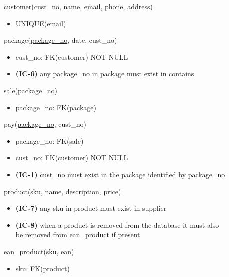 \documentclass[12pt,a4paper]{article}
\begin{document}
\ttfamily

\vspace*{10pt}
\noindent
customer(\underline{cust\_no}, name, email, phone, address)
\begin{itemize}[nosep]
    \item UNIQUE(email)
\end{itemize}

\vspace*{10pt}
\noindent
package(\underline{package\_no}, date, cust\_no)
\begin{itemize}[nosep]
    \item cust\_no: FK(customer) NOT NULL
    \item \textsf{\textbf{(IC-6)}} any package\_no in package \textsf{must exist} in contains
\end{itemize}

\vspace*{10pt}
\noindent
sale(\underline{package\_no})
\begin{itemize}[nosep]
    \item package\_no: FK(package)
\end{itemize}

\vspace*{10pt}
\noindent
pay(\underline{package\_no}, cust\_no)
\begin{itemize}[nosep]
    \item package\_no: FK(sale)
    \item cust\_no: FK(customer) NOT NULL
    \item \textsf{\textbf{(IC-1)}} cust\_no \textsf{must exist} in the package identified by package\_no
\end{itemize}

\vspace*{10pt}
\noindent
product(\underline{sku}, name, description, price)
\begin{itemize}[nosep]
    \item \textsf{\textbf{(IC-7)}} any sku in product \textsf{must exist} in supplier
    \item \textsf{\textbf{(IC-8)}} when a product \textsf{is removed} from the database it \textsf{must also}\\
          be removed from ean\_product if present
\end{itemize}

\vspace*{10pt}
\noindent
ean\_product(\underline{sku}, ean)
\begin{itemize}[nosep]
    \item sku: FK(product)
\end{itemize}
\end{document}

